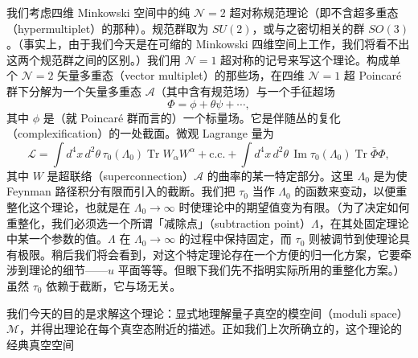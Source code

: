 我们考虑四维 Minkowski 空间中的纯 $\mathcal{N}=2$ 超对称规范理论（即不含超多重态（hypermultiplet）的那种）。规范群取为 $SU(2)$，或与之密切相关的群 $SO(3)$。（事实上，由于我们今天是在可缩的 Minkowski 四维空间上工作，我们将看不出这两个规范群之间的区别。）我们用 $\mathcal{N}=1$ 超对称的记号来写这个理论。构成单个 $\mathcal{N}=2$ 矢量多重态（vector multiplet）的那些场，在四维 $\mathcal{N}=1$ 超 Poincaré 群下分解为一个矢量多重态 $\mathcal{A}$（其中含有规范场）与一个手征超场
\[
\Phi=\phi+\theta\psi+\cdots,
\]
其中 $\phi$ 是（就 Poincaré 群而言的）一个标量场。它是伴随丛的复化（complexification）的一处截面。微观 Lagrange 量为
\[
\mathcal{L}=\int d^4x\,d^2\theta\,\tau_0(\Lambda_0)\operatorname{Tr}W_\alpha W^\alpha+\text{c.c.}+\int d^4x\,d^2\theta\,\operatorname{Im}\tau_0(\Lambda_0)\operatorname{Tr}\bar\Phi\Phi,
\]
其中 $W$ 是超联络（superconnection）$\mathcal{A}$ 的曲率的某一特定部分。这里 $\Lambda_0$ 是为使 Feynman 路径积分有限而引入的截断。我们把 $\tau_0$ 当作 $\Lambda_0$ 的函数来变动，以便重整化这个理论，也就是在 $\Lambda_0\to\infty$ 时使理论中的期望值变为有限。（为了决定如何重整化，我们必须选一个所谓「减除点」（subtraction point）$\Lambda$，在其处固定理论中某一个参数的值。$\Lambda$ 在 $\Lambda_0\to\infty$ 的过程中保持固定，而 $\tau_0$ 则被调节到使理论具有极限。稍后我们将会看到，对这个特定理论存在一个方便的归一化方案，它要牵涉到理论的细节——$u$ 平面等等。但眼下我们先不指明实际所用的重整化方案。）虽然 $\tau_0$ 依赖于截断，它与场无关。


我们今天的目的是求解这个理论：显式地理解量子真空的模空间（moduli space）$\mathcal{M}$，并得出理论在每个真空态附近的描述。正如我们上次所确立的，这个理论的经典真空空间

